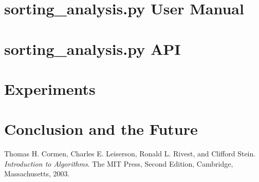 \documentclass[refman]{scrartcl}
\begin{document}

\newpage
%

%

%

%
%
%
\section{sorting_analysis.py User Manual}

\section{sorting_analysis.py API}

\section{Experiments}
\section{Conclusion and the Future}
\newpage
\begin{thebibliography}{9}
        Thomas H. Cormen, Charles E. Leiserson, Ronald L. Rivest, and Clifford Stein. 
        \textit{Introduction to Algorithms}. 
        The MIT Press, Second Edition, Cambridge, Massachusetts, 2003.
%
\end{thebibliography}
\end{document}
